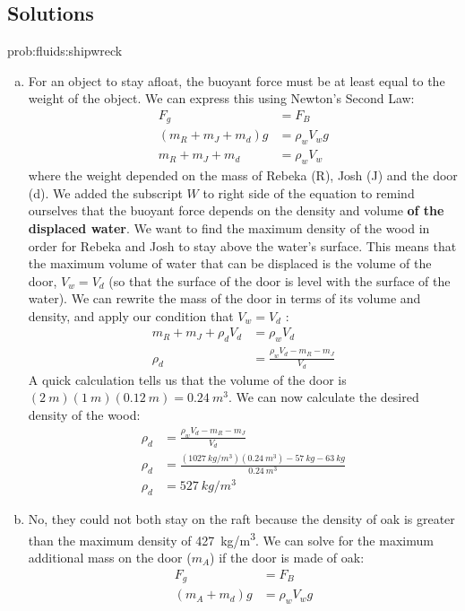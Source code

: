 {{\subsection{Solutions}
\begin{solution}{prob:fluids:shipwreck}\label{soln:fluids:shipwreck}
\begin{enumerate}[(a)]
\item For an object to stay afloat, the buoyant force must be at least equal to the weight of the object. We can express this using Newton's Second Law:
\begin{align*}
F_g&=F_B\\
(m_R+m_J+m_d)g&=\rho_wV_wg\\
m_R+m_J+m_d&=\rho_wV_w
\end{align*}
where the weight depended on the mass of Rebeka (R), Josh (J) and the door (d). We added the subscript $W$ to right side of the equation to remind ourselves that the buoyant force depends on the density and volume \textbf{of the displaced water}. We want to find the maximum density of the wood in order for Rebeka and Josh to stay above the water's surface. This means that the maximum volume of water that can be displaced is the volume of the door, $V_w=V_d$ (so that the surface of the door is level with the surface of the water). We can rewrite the mass of the door in terms of its volume and density, and apply our condition that $V_w=V_d$ :
\begin{align*}
m_R+m_J+\rho_dV_d&=\rho_wV_d\\
\rho_d&=\frac{\rho_wV_d-m_R-m_J}{V_d}
\end{align*}
A quick calculation tells us that the volume of the door is $(\SI{2}{m})(\SI{1}{m})(\SI{0.12}{m})=\SI{0.24}{m^3}$. We can now calculate the desired density of the wood:
\begin{align*}
\rho_d&=\frac{\rho_wV_d-m_R-m_J}{V_d}\\
\rho_d&=\frac{(\SI{1027}{kg/m^3})(\SI{0.24}{m^3})-\SI{57}{kg}-\SI{63}{kg}}{\SI{0.24}{m^3}}\\
\rho_d&=\SI{527}{kg/m^3}
\end{align*}
\item No, they could not both stay on the raft because the density of oak is greater than the maximum density of \SI{427}{kg/m^3}. We can solve for the maximum additional mass on the door ($m_A$) if the door is made of oak:
\begin{align*}
F_g&=F_B\\
(m_A+m_d)g&=\rho_wV_wg\\

\end{align*}
\end{enumerate}
\end{solution}}}
